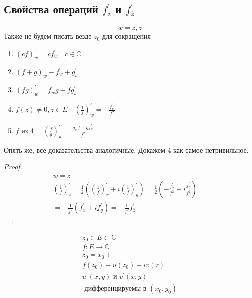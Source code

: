 \documentclass[main]{subfiles}
\begin{document}
\subsection*{Свойства операций $f^\prime_z$ и $f^\prime_{\overline{z}}$}
\[ w = z, \overline{z} \]
Также не будем писать везде $z_0$ для сокращения
\begin{enumerate}
    \item $(cf)^\prime_w = cf^\prime_w \quad c \in \mathbb{C}$
    \item $(f+g)^\prime_w - f^\prime_w + g^\prime_w $ 
    \item $(fg)^\prime_w = f^\prime_w g + f g^\prime_w $
    \item $f(z) \ne 0, z \in E \quad \left(\frac{1}{f}\right)^\prime_w = - \frac{f^\prime_w}{f^2}$
    \item $f$ из 4 $\quad \left(\frac{f}{g}\right)^\prime_w = \frac{g^\prime_w f - g f^\prime_w}{f^2}$
\end{enumerate}

Опять же, все доказательства аналогичные. Докажем 4 как самое нетривильное.
\begin{proof}
    \begin{multline*}
        w = \overline{z} \\
        \left(\frac{1}{f}\right)^\prime_{\overline{z}} = \frac{1}{2}\left(\left(\frac{1}{f}\right)^\prime_x + i\left(\frac{1}{f} \right)^\prime_y\right) 
        = \frac{1}{2}\left(-\frac{f^\prime_x}{f^2}-i\frac{f^\prime_y}{f^2}\right) = \\
       = -\frac{1}{f^2}\left(f^\prime_x + if^\prime_y\right) = -\frac{1}{f^2}f^\prime_{\overline{z}}
    \end{multline*}
\end{proof}

\begin{definition}
    \begin{gather*}
        z_0 \in E \subset \mathbb{C} \\
        f: E \rightarrow \mathbb{C} \\
        z_0 = x_0 +  \\
        f(z_0) - u(z_0) + iv(z) \\
        u^\prime(x,y) \text{ и } v^\prime(x,y) \\
        \text{ дифференцируемы в } (x_0, y_0) 
    \end{gather*}
\end{definition}
\end{document}
